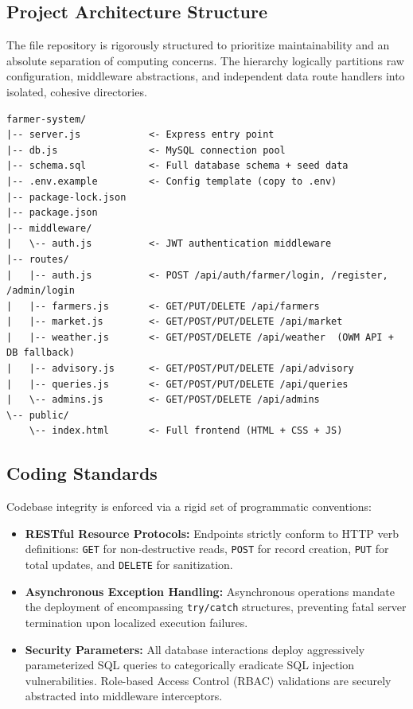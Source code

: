 \subsection{Project Architecture Structure}
The file repository is rigorously structured to prioritize maintainability and an absolute separation of computing concerns. The hierarchy logically partitions raw configuration, middleware abstractions, and independent data route handlers into isolated, cohesive directories.

\begin{verbatim}
farmer-system/
|-- server.js            <- Express entry point
|-- db.js                <- MySQL connection pool
|-- schema.sql           <- Full database schema + seed data
|-- .env.example         <- Config template (copy to .env)
|-- package-lock.json
|-- package.json
|-- middleware/
|   \-- auth.js          <- JWT authentication middleware
|-- routes/
|   |-- auth.js          <- POST /api/auth/farmer/login, /register, /admin/login
|   |-- farmers.js       <- GET/PUT/DELETE /api/farmers
|   |-- market.js        <- GET/POST/PUT/DELETE /api/market
|   |-- weather.js       <- GET/POST/DELETE /api/weather  (OWM API + DB fallback)
|   |-- advisory.js      <- GET/POST/PUT/DELETE /api/advisory
|   |-- queries.js       <- GET/POST/PUT/DELETE /api/queries
|   \-- admins.js        <- GET/POST/DELETE /api/admins
\-- public/
    \-- index.html       <- Full frontend (HTML + CSS + JS)
\end{verbatim}

\subsection{Coding Standards}
Codebase integrity is enforced via a rigid set of programmatic conventions:
\begin{itemize}
    \item \textbf{RESTful Resource Protocols:} Endpoints strictly conform to HTTP verb definitions: \texttt{GET} for non-destructive reads, \texttt{POST} for record creation, \texttt{PUT} for total updates, and \texttt{DELETE} for sanitization.
    \item \textbf{Asynchronous Exception Handling:} Asynchronous operations mandate the deployment of encompassing \texttt{try/catch} structures, preventing fatal server termination upon localized execution failures.
    \item \textbf{Security Parameters:} All database interactions deploy aggressively parameterized SQL queries to categorically eradicate SQL injection vulnerabilities. Role-based Access Control (RBAC) validations are securely abstracted into middleware interceptors.
\end{itemize}

